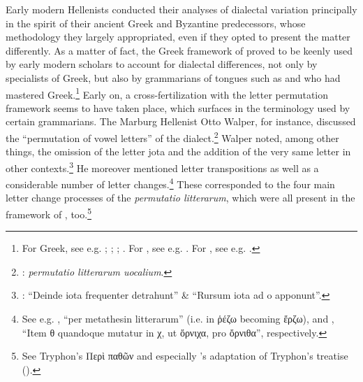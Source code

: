 Early modern Hellenists conducted their analyses of dialectal variation principally in the spirit of their ancient Greek and Byzantine predecessors, whose methodology they largely appropriated, even if they opted to present the matter differently. As a matter of fact, the Greek framework of  proved to be keenly used by early modern scholars to account for dialectal differences, not only by specialists of Greek, but also by grammarians of  tongues such as  and  who had mastered Greek.\footnote{{For Greek, see e.g. \citet[b.iv\textsc{\textsuperscript{v}}]{Melanchthon1518}; \citet[{7}{\textsc{\textsuperscript{v}}}{–11}{\textsc{\textsuperscript{v}}}]{Baile1588}; \citet[11]{Schmidt1604}; \citet[2–8, 20–22]{Hill1658}. For , see e.g. \citet{Wolf1578}. For , see e.g. \citet[130--133]{Gill1619}.}} Early on, a cross-fertilization with the  letter permutation framework seems to have taken place, which surfaces in the terminology used by certain grammarians. The Marburg Hellenist Otto Walper, for instance, discussed the “permutation of vowel letters” of the  dialect.\footnote{{\citet[62]{Walper1589}:} {\textit{permutatio litterarum uocalium}}.} Walper noted, among other things, the omission of the letter jota and the addition of the very same letter in other contexts.\footnote{{\citet[63]{Walper1589}: “Deinde iota frequenter detrahunt” \& “Rursum iota ad o apponunt”.}} He moreover mentioned letter transpositions as well as a considerable number of letter changes.\footnote{{See e.g. \citet[63]{Walper1589}, “per metathesin litterarum” (i.e. in ῥέζω becoming ἔρζω), and \citet[64]{Walper1589}, “Item θ quandoque mutatur in χ, ut ὄρνιχα, pro ὄρνιθα”, respectively.}} These corresponded to the four main letter change processes of the \textit{permutatio litterarum}, which were all present in the framework of , too.\footnote{{See Tryphon’s Περὶ παθῶν and especially \citeauthor{Amerot1520}'s adaptation of Tryphon’s  treatise  (\citeyear[\textsc{p.}{iv}{\textsc{\textsuperscript{v}}}]{Amerot1520}).}}

